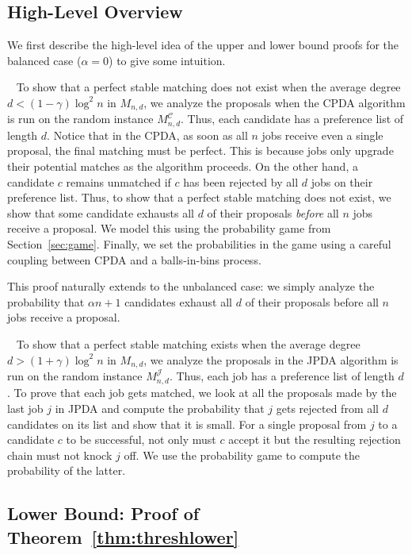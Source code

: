 \documentclass[11pt]{amsart}
\newcommand{\pparagraph}[1]{
\vspace{0.13in}\noindent{\textbf{\boldmath #1}}~}
\begin{document}
\subsection{High-Level Overview}
We first describe the high-level idea of the upper and lower bound proofs for the balanced case ($\alpha=0$) to give some intuition.  

\pparagraph{Lower bound.}  To show that a perfect stable matching does not exist when the average degree $d < (1- \gamma) \log^2 n$ in $M_{n, d}$, we analyze the proposals when the CPDA algorithm is run on the random instance $M_{n, d}^{\mathcal{C}}$.  Thus, each candidate has a preference list of length $d$. Notice that in the CPDA, as soon as all $n$ jobs receive even a single proposal, the final matching must be perfect.  This is because jobs only upgrade their potential matches as the algorithm proceeds. On the other hand, a candidate $c$ remains unmatched if $c$ has been rejected by all $d$ jobs on their preference list.  Thus, to show that a perfect stable matching does not exist, we show that some candidate exhausts all $d$ of their proposals \emph{before} all $n$ jobs receive a proposal.  We model this using the probability game from Section~\ref{sec:game}.  Finally, we set the probabilities in the game using a careful coupling between CPDA and a balls-in-bins process.


This proof naturally extends to the unbalanced case:  we simply analyze the probability that $\alpha n + 1$ candidates exhaust all $d$ of their proposals before all $n$ jobs receive a proposal.

\pparagraph{Upper bound.} To show that a perfect stable matching exists when the average degree $d > (1+ \gamma) \log^2 n$ in $M_{n, d}$, we analyze the proposals in the JPDA algorithm is run on the random instance $M_{n, d}^{\mathcal{J}}$.  Thus, each job has a preference list of length $d$.
To prove that each job gets matched, we look at all the proposals made by the last job $j$ in JPDA and compute the probability that $j$ gets rejected from all $d$ candidates on its list and show that it is small.  For a single proposal from $j$ to a candidate $c$ to be successful, not only must $c$ accept it but the resulting rejection chain must not knock $j$ off.  We use the probability game to compute the probability of the latter.  

\subsection{Lower Bound: Proof of Theorem~\ref{thm:threshlower}}\label{sec:lower}
\end{document}
